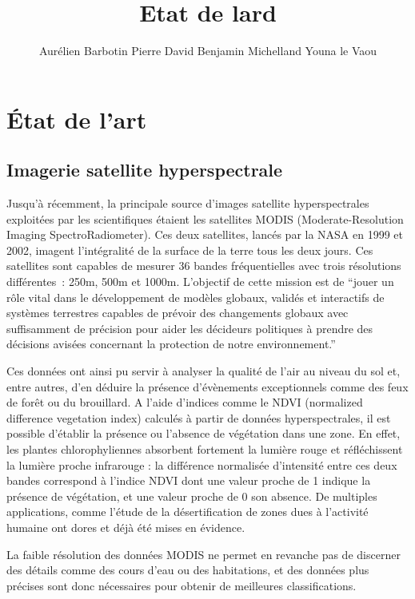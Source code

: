 \documentclass[a4paper,10pt]{article}
\title{Etat de lard}
\author{Aurélien Barbotin Pierre David Benjamin Michelland Youna le Vaou}
\begin{document}
\maketitle

\section{État de l'art}
\subsection{Imagerie satellite hyperspectrale}

Jusqu'à récemment, la principale source d'images satellite hyperspectrales exploitées par les scientifiques étaient les satellites MODIS (Moderate-Resolution Imaging SpectroRadiometer). Ces deux satellites, lancés par la NASA en 1999 et 2002, imagent l'intégralité de la surface de la terre tous les deux jours. Ces satellites sont capables de mesurer 36 bandes fréquentielles avec trois résolutions différentes : 250m, 500m et 1000m\cite{nasa}. L'objectif de cette mission est de ``jouer un rôle vital dans le développement de modèles globaux, validés et interactifs de systèmes terrestres capables de prévoir des changements globaux avec suffisamment de précision pour aider les décideurs politiques à prendre des décisions avisées concernant la protection de notre environnement.''

Ces données ont ainsi pu servir à analyser la qualité de l'air au niveau du sol et, entre autres, d'en déduire la présence d'évènements exceptionnels comme des feux de forêt ou du brouillard\cite{airSurv}. A l'aide d'indices comme le NDVI (normalized difference vegetation index) calculés à partir de données hyperspectrales, il est possible d'établir la présence ou l'absence de végétation dans une zone. En effet, les plantes chlorophyliennes absorbent fortement la lumière rouge et réfléchissent la lumière proche infrarouge : la différence normalisée d'intensité entre ces deux bandes correspond à l'indice NDVI dont une valeur proche de 1 indique la présence de végétation, et une valeur proche de 0 son absence. De multiples applications, comme l'étude de la désertification de zones dues à l'activité humaine\cite{desert} ont dores et déjà été mises en évidence.

La faible résolution des données MODIS ne permet en revanche pas de discerner des détails comme des cours d'eau ou des habitations, et des données plus précises sont donc nécessaires pour obtenir de meilleures classifications. 
\end{document}
